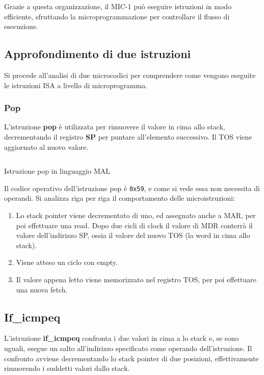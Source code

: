 Grazie a questa organizzazione, il MIC-1 può eseguire istruzioni in modo efficiente, sfruttando la microprogrammazione per controllare il flusso di esecuzione.

\subsection{Approfondimento di due istruzioni}
Si procede all'analisi di due microcodici per comprendere come vengono eseguite le istruzioni ISA a livello di microprogramma.

\subsubsection*{Pop}

L'istruzione \textbf{pop} è utilizzata per rimuovere il valore in cima allo stack, decrementando il registro \textbf{SP} per puntare all'elemento successivo. Il TOS viene aggiornato al nuovo valore.

\begin{code}
    \inputminted{text}{mal-ajvm/pop.mal}
    \caption{Istruzione pop in linguaggio MAL}
    \label{cod:pop_mal}
\end{code}

Il codice operativo dell'istruzione pop è \texttt{0x59}, e come si vede essa non necessita di operandi. Si analizza riga per riga il comportamento delle microistruzioni:

\begin{enumerate}
    \item Lo stack pointer viene decrementato di uno, ed assegnato anche a MAR, per poi effettuare una read. Dopo due cicli di clock il valore di MDR conterrà il valore dell'indirizzo SP, ossia il valore del nuovo TOS (la word in cima allo stack).
    \item Viene atteso un ciclo con empty.
    \item Il valore appena letto viene memorizzato nel registro TOS, per poi effettuare una nuova fetch.
\end{enumerate}

\subsection*{If\_icmpeq}
L'istruzione \textbf{if\_icmpeq} confronta i due valori in cima a lo stack e, se sono uguali, esegue un salto all'indirizzo specificato come operando dell'istruzione. Il confronto avviene decrementando lo stack pointer di due posizioni, effettivamente rimuovendo i suddetti valori dallo stack.

